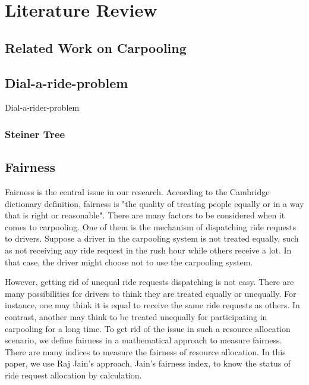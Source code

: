 
\chapter{Literature Review}

\section{Related Work on Carpooling}

\section{Dial-a-ride-problem}

Dial-a-rider-problem

\subsection{Steiner Tree}

\section{Fairness}

Fairness is the central issue in our research. According to the Cambridge dictionary definition, fairness is "the quality of treating people equally or in a way that is right or reasonable"\cite{noauthor_fairness_nodate}. There are many factors to be considered when it comes to carpooling. One of them is the mechanism of dispatching ride requests to drivers. Suppose a driver in the carpooling system is not treated equally, such as not receiving any ride request in the rush hour while others receive a lot. In that case, the driver might choose not to use the carpooling system. 

However, getting rid of unequal ride requests dispatching is not easy. There are many possibilities for drivers to think they are treated equally or unequally. For instance, one may think it is equal to receive the same ride requests as others. In contrast, another may think to be treated unequally for participating in carpooling for a long time. To get rid of the issue in such a resource allocation scenario, we define fairness in a mathematical approach to measure fairness. There are many indices to measure the fairness of resource allocation\cite{jain_99-0045_nodate}. In this paper, we use Raj Jain's approach, Jain's fairness index\cite{jain_quantitative_1998}, to know the status of ride request allocation by calculation.

